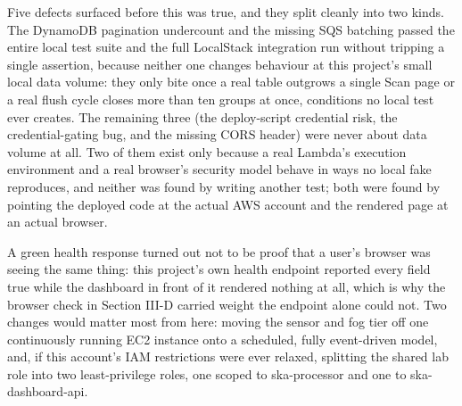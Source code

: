 \documentclass[conference]{IEEEtran}
\begin{document}
Five defects surfaced before this was true, and they split cleanly into two kinds. The DynamoDB pagination undercount and the missing SQS batching passed the entire local test suite and the full LocalStack integration run without tripping a single assertion, because neither one changes behaviour at this project's small local data volume: they only bite once a real table outgrows a single Scan page or a real flush cycle closes more than ten groups at once, conditions no local test ever creates. The remaining three (the deploy-script credential risk, the credential-gating bug, and the missing CORS header) were never about data volume at all. Two of them exist only because a real Lambda's execution environment and a real browser's security model behave in ways no local fake reproduces, and neither was found by writing another test; both were found by pointing the deployed code at the actual AWS account and the rendered page at an actual browser.

A green health response turned out not to be proof that a user's browser was seeing the same thing: this project's own health endpoint reported every field true while the dashboard in front of it rendered nothing at all, which is why the browser check in Section III-D carried weight the endpoint alone could not. Two changes would matter most from here: moving the sensor and fog tier off one continuously running EC2 instance onto a scheduled, fully event-driven model, and, if this account's IAM restrictions were ever relaxed, splitting the shared lab role into two least-privilege roles, one scoped to ska-processor and one to ska-dashboard-api.



\end{document}
